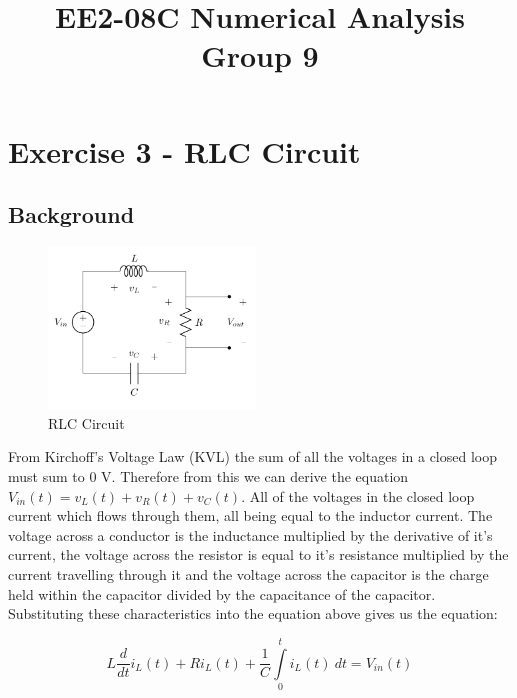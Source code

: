 \documentclass[11pt,a4paper]{article}
\date{}
\author{}
\begin{document}
\vspace{-20mm}
\title{\textbf{EE2-08C Numerical Analysis} \\ Group 9\vspace{-17mm}}
\maketitle
\tableofcontents
\pagebreak
\section{Exercise 3 - RLC Circuit}\vspace{-1mm}
\subsection{Background}

\begin{figure}
\vspace{-10mm}
  		\includegraphics[width=0.49\textwidth]{Ex3_Figs/RLC.png}
\vspace{-6mm}
  	\caption{RLC Circuit}
  	\label{fig:RLC}
\end{figure}


From Kirchoff's Voltage Law (KVL) the sum of all the voltages in a closed loop must sum to 0 V. Therefore from this we can derive the equation $V_{in}(t) = v_L(t)+v_R(t)+v_C(t)$. All of the voltages in the closed loop current which flows through them, all being equal to the inductor current. The voltage across a conductor is the inductance multiplied by the derivative of it's current, the voltage across the resistor is equal to it's resistance multiplied by the current travelling through it and the voltage across the capacitor is the charge held within the capacitor divided by the capacitance of the capacitor. Substituting these characteristics into the equation above gives us the equation:

\[ L \frac{d}{dt}i_L(t) + R i_L(t) + \frac{1}{C}\int\limits_0^t i_L(t) \ dt = V_{in}(t)\]
\end{document}
